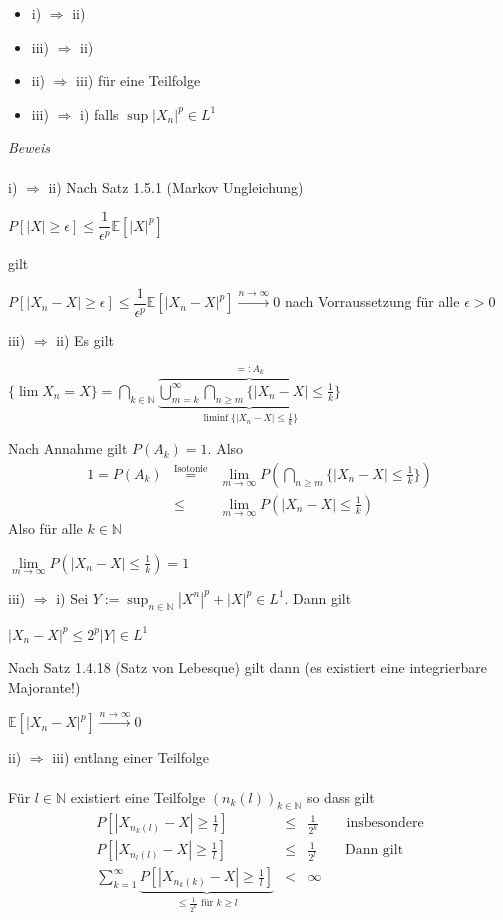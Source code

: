 \documentclass[10pt,a4paper]{report}
\newcommand{\E}{\mathbb{E}}
\newcommand{\N}{\mathbb{N}}
\numberwithin{equation}{section}
\numberwithin{figure}{section}
\theoremstyle{plain}
\theoremstyle{definition}
\theoremstyle{plain}
\theoremstyle{definition}
\theoremstyle{remark}
\theoremstyle{plain}
\begin{document}
\begin{itemize}
\item i) $\Rightarrow$ ii)
\item iii) $\Rightarrow$ ii)
\item ii) $\Rightarrow$ iii) für eine Teilfolge
\item iii) $\Rightarrow$ i) falls $\sup|X_n|^p \in L^1$
\end{itemize}
\textit{Beweis}\\\\
i) $\Rightarrow$ ii) Nach Satz 1.5.1 (Markov Ungleichung)
\begin{center}
$P[|X|\geq \epsilon] \leq \dfrac{1}{\epsilon^p}\E[|X|^p]$
\end{center}
gilt
\begin{center}
$P[|X_n-X|\geq \epsilon] \leq \dfrac{1}{\epsilon^p} \E[|X_n-X|^p] \overset{n \to \infty}{\to} 0$ nach Vorraussetzung für alle $\epsilon>0$
\end{center}
iii) $\Rightarrow$ ii) Es gilt 
\begin{center}
$\{\lim X_n=X\}=\bigcap\limits_{k \in \N}\underbrace{\overbrace{\bigcup\limits_{m=k}^\infty\bigcap\limits_{n\geq m} \{|X_n-X|\leq \frac{1}{k}\}}}^{=:A_k}_{\liminf \{|X_n-X|\leq \frac{1}{k}\}}$
\end{center}
Nach Annahme gilt $P(A_k)=1$. Also
\begin{eqnarray*}
1=P(A_k)&\overset{\text{Isotonie}}{=}& \lim\limits_{m \to \infty} P(\bigcap\limits_{n\geq m}\{|X_n-X|\leq \frac{1}{k}\})\\
&\leq& \lim\limits_{m \to \infty} P(|X_n-X|\leq \frac{1}{k})
\end{eqnarray*}
Also für alle $k \in \N$
\begin{center}
$\lim\limits_{m \to \infty} P(|X_n-X|\leq\frac{1}{k})=1$
\end{center}
iii) $\Rightarrow$ i) Sei $Y:=\sup_{n \in \N}|X^n|^p+|X|^p \in L^1$. Dann gilt
\begin{center}
$|X_n-X|^p\leq 2^p|Y| \in L^1$
\end{center}
Nach Satz 1.4.18 (Satz von Lebesque) gilt dann (es existiert eine integrierbare Majorante!)
\begin{center}
$\E[|X_n-X|^p]\overset{n \to \infty}{\to} 0$
\end{center}
ii) $\Rightarrow$ iii) entlang einer Teilfolge\\\\
Für $l \in \N$ existiert eine Teilfolge $(n_k(l))_{k \in \N}$ so dass gilt
\begin{eqnarray*}
P[|X_{n_k(l)}-X|\geq \frac{1}{l}] &\leq& \frac{1}{2^k} \qquad \text{insbesondere}\\
P[|X_{n_l(l)}-X|\geq \frac{1}{l}] &\leq& \frac{1}{2^l} \qquad \text{Dann gilt}\\
\sum\limits_{k=1}^\infty \underbrace{P[|X_{n_k(k)}-X|\geq \frac{1}{l}]}_{\leq \frac{1}{2^k} \text{ für } k \geq l} &<& \infty
\end{eqnarray*}
\end{document}

